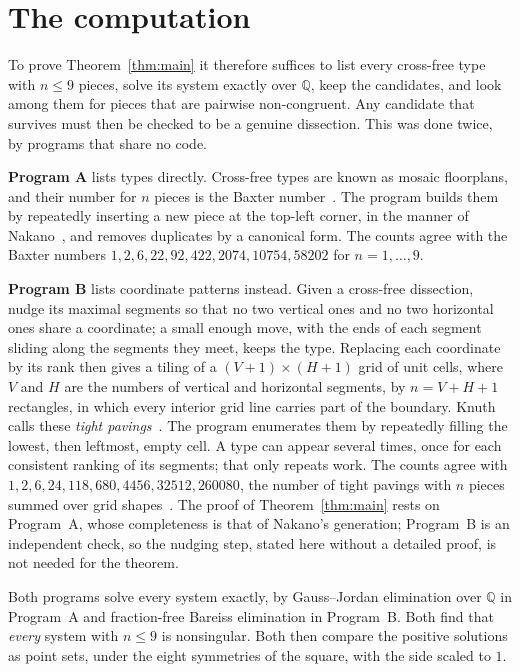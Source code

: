 \documentclass[11pt]{article}
\begin{document}
\section{The computation}\label{sec:computation}

To prove Theorem~\ref{thm:main} it therefore suffices to list every cross-free type with $n\le 9$ pieces, solve its system exactly over $\mathbb{Q}$, keep the candidates, and look among them for pieces that are pairwise non-congruent. Any candidate that survives must then be checked to be a genuine dissection. This was done twice, by programs that share no code.

\textbf{Program A} lists types directly. Cross-free types are known as mosaic floorplans, and their number for $n$ pieces is the Baxter number~\cite{yao}. The program builds them by repeatedly inserting a new piece at the top-left corner, in the manner of Nakano~\cite{nakano}, and removes duplicates by a canonical form. The counts agree with the Baxter numbers $1, 2, 6, 22, 92, 422, 2074, 10754, 58202$ for $n=1,\dots,9$.

\textbf{Program B} lists coordinate patterns instead. Given a cross-free dissection, nudge its maximal segments so that no two vertical ones and no two horizontal ones share a coordinate; a small enough move, with the ends of each segment sliding along the segments they meet, keeps the type. Replacing each coordinate by its rank then gives a tiling of a $(V+1)\times(H+1)$ grid of unit cells, where $V$ and $H$ are the numbers of vertical and horizontal segments, by $n=V+H+1$ rectangles, in which every interior grid line carries part of the boundary. Knuth calls these \emph{tight pavings}~\cite{knuth}. The program enumerates them by repeatedly filling the lowest, then leftmost, empty cell. A type can appear several times, once for each consistent ranking of its segments; that only repeats work. The counts agree with $1, 2, 6, 24, 118, 680, 4456, 32512, 260080$, the number of tight pavings with $n$ pieces summed over grid shapes~\cite{oeis298432}. The proof of Theorem~\ref{thm:main} rests on Program~A, whose completeness is that of Nakano's generation; Program~B is an independent check, so the nudging step, stated here without a detailed proof, is not needed for the theorem.

Both programs solve every system exactly, by Gauss--Jordan elimination over $\mathbb{Q}$ in Program~A and fraction-free Bareiss elimination in Program~B. Both find that \emph{every} system with $n\le 9$ is nonsingular. Both then compare the positive solutions as point sets, under the eight symmetries of the square, with the side scaled to $1$.
\end{document}
